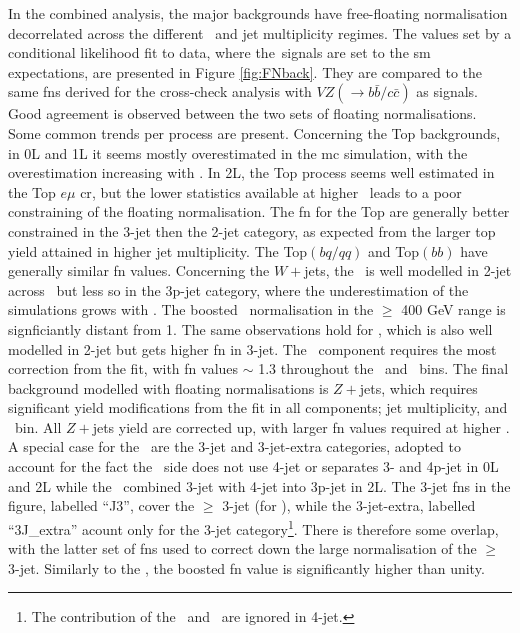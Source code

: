 In the combined analysis, the major backgrounds have free-floating normalisation decorrelated across the different \ptv\ and jet multiplicity regimes. The values set by a conditional likelihood fit to data, where the\vhbc\ signals are set to the \gls{sm} expectations, are presented in Figure \ref{fig:FNback}. They are compared to the same \gls{fn}s derived for the cross-check analysis with $VZ(\rightarrow b\bar{b}/c\bar{c})$ as signals. Good agreement is observed between the two sets of floating normalisations. Some common trends per process are present. Concerning the Top backgrounds, in 0L and 1L it seems mostly overestimated in the \gls{mc} simulation, with the overestimation increasing with \ptv. In 2L, the Top process seems well estimated in the Top $e\mu$ \gls{cr}, but the lower statistics available at higher \ptv\ leads to a poor constraining of the floating normalisation. The \gls{fn} for the Top are generally better constrained in the 3-jet then the 2-jet category, as expected from the larger top yield attained in higher jet multiplicity. The Top$(bq/qq)$ and Top$(bb)$ have generally similar \gls{fn} values. Concerning the $W+$jets, the \whf\ is well modelled in 2-jet across \ptv\ but less so in the 3p-jet category, where the underestimation of the simulations grows with \ptv. The boosted \whf\ normalisation in the $\geq$ 400 GeV range is signficiantly distant from 1. The same observations hold for \wlf, which is also well modelled in 2-jet but gets higher \gls{fn} in 3-jet. The \wmf\ component requires the most correction from the fit, with \gls{fn} values $\sim$ 1.3 throughout the \nj\ and \ptv\ bins. The final background modelled with floating normalisations is $Z+$jets, which requires significant yield modifications from the fit in all components; jet multiplicity, and \ptv\ bin. All $Z+$jets yield are corrected up, with larger \gls{fn} values required at higher \ptv. A special case for the \zhf\ are the 3-jet and 3-jet-extra categories, adopted to account for the fact the \vhc\ side does not use 4-jet or separates 3- and 4p-jet in 0L and 2L while the \vhb\ combined 3-jet with 4-jet into 3p-jet in 2L. The 3-jet \gls{fn}s in the figure, labelled ``J3'', cover the $\geq$ 3-jet (for \vhb), while the 3-jet-extra, labelled ``3J\_extra'' acount only for the 3-jet category\footnote{The contribution of the \zmf\ and \zlf\ are ignored in 4-jet.}. There is therefore some overlap, with the latter set of \gls{fn}s used to correct down the large normalisation of the $\geq$ 3-jet. Similarly to the \whf, the boosted \zhf \gls{fn} value is significantly higher than unity.

